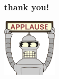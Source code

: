 \documentclass{beamer}
\begin{document}




\begin{frame}
\frametitle{thank you!}
\begin{center}
\vspace{2em}
\includegraphics[width=100px]{bender}
\end{center}
\end{frame}
\end{document}
